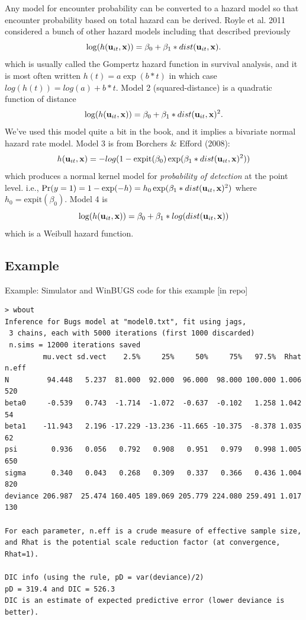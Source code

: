 Any model for encounter probability can be converted to a hazard model
so that encounter probability based on total hazard can be derived.
Royle et al. 2011 considered a bunch of other hazard models including
that described previously
\[
\log(h({\bf u}_{it},{\bf x})) = \beta_{0} + \beta_{1}*dist({\bf u}_{it},{\bf x}).
\]
which is usually called the Gompertz hazard function in survival
analysis, and it is most often written $h(t) = a \exp( b*t)$ in which
case $log(h(t)) = log(a) + b*t$.  Model 2 (squared-distance) is a
quadratic function of distance
\[
\log(h({\bf u}_{it},{\bf x})) = \beta_{0} + \beta_{1}*dist({\bf u}_{it},{\bf x})^2.
\]
We've used this model quite a bit in the book, and it implies a
bivariate normal hazard rate model. Model 3 is from Borchers \& Efford
(2008):
\[
h({\bf u}_{it},{\bf x} ) = -log(1 - \mbox{expit}(\beta_{0})
\exp( \beta_{1}*dist({\bf u}_{it},{\bf x})^2 ) )
\]
which produces a normal kernel model for {\it probability of
  detection} at the point level. i.e., $\Pr(y=1) = 1-\exp(-h) = h_{0}
\exp( \beta_{1}*dist({\bf u}_{it},{\bf x})^2 )$ where $h_{0} =
\mbox{expit}(\beta_{0})$.  Model 4 is
\[
\log(h({\bf u}_{it},{\bf x})) = \beta_{0} + \beta_{1}*log(dist({\bf u}_{it},{\bf x}))
\]
which is a Weibull hazard function.













\subsection{Example}

 Example: Simulator and WinBUGS code for this example [in repo]



\begin{verbatim}
> wbout
Inference for Bugs model at "model0.txt", fit using jags,
 3 chains, each with 5000 iterations (first 1000 discarded)
 n.sims = 12000 iterations saved
         mu.vect sd.vect    2.5%     25%     50%     75%   97.5%  Rhat n.eff
N         94.448   5.237  81.000  92.000  96.000  98.000 100.000 1.006   520
beta0     -0.539   0.743  -1.714  -1.072  -0.637  -0.102   1.258 1.042    54
beta1    -11.943   2.196 -17.229 -13.236 -11.665 -10.375  -8.378 1.035    62
psi        0.936   0.056   0.792   0.908   0.951   0.979   0.998 1.005   650
sigma      0.340   0.043   0.268   0.309   0.337   0.366   0.436 1.004   820
deviance 206.987  25.474 160.405 189.069 205.779 224.080 259.491 1.017   130

For each parameter, n.eff is a crude measure of effective sample size,
and Rhat is the potential scale reduction factor (at convergence, Rhat=1).

DIC info (using the rule, pD = var(deviance)/2)
pD = 319.4 and DIC = 526.3
DIC is an estimate of expected predictive error (lower deviance is better).
\end{verbatim}




